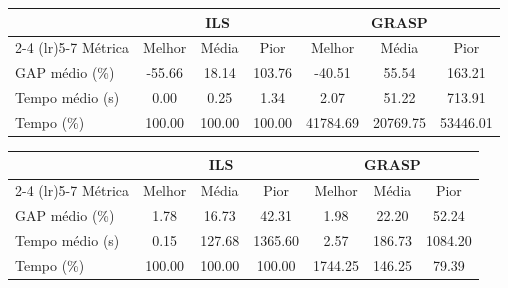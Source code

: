 
\begin{tabular}{lcccccc}
    \toprule
    & \multicolumn{3}{c}{ILS} & \multicolumn{3}{c}{GRASP} \\
    \cmidrule(lr){2-4} \cmidrule(lr){5-7}
    Métrica & Melhor & Média & Pior & Melhor & Média & Pior \\
    \midrule
    GAP médio (\%) & -55.66 & 18.14 & 103.76 & -40.51 & 55.54 & 163.21 \\
    Tempo médio (s) & 0.00 & 0.25 & 1.34 & 2.07 & 51.22 & 713.91 \\
    Tempo (\%) & 100.00 & 100.00 & 100.00 & 41784.69 & 20769.75 & 53446.01 \\
    \bottomrule
\end{tabular}



\begin{tabular}{lcccccc}
    \toprule
    & \multicolumn{3}{c}{ILS} & \multicolumn{3}{c}{GRASP} \\
    \cmidrule(lr){2-4} \cmidrule(lr){5-7}
    Métrica & Melhor & Média & Pior & Melhor & Média & Pior \\
    \midrule
    GAP médio (\%) & 1.78 & 16.73 & 42.31 & 1.98 & 22.20 & 52.24 \\
    Tempo médio (s) & 0.15 & 127.68 & 1365.60 & 2.57 & 186.73 & 1084.20 \\
    Tempo (\%) & 100.00 & 100.00 & 100.00 & 1744.25 & 146.25 & 79.39 \\
    \bottomrule
\end{tabular}
